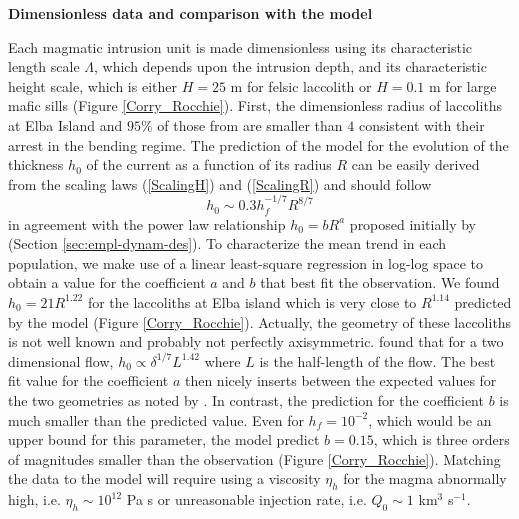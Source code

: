 \vspace{.5cm}  \textbf{Dimensionless  data  and  comparison  with  the
  model} \vspace{.5cm}

Each  magmatic   intrusion  unit  is  made   dimensionless  using  its
characteristic  length   scale  $\Lambda$,  which  depends   upon  the
intrusion depth, and its characteristic  height scale, which is either
$H=25$  m for  felsic laccolith  or $H=0.1$  m for  large mafic  sills
(Figure  \ref{Corry_Rocchie}).   First,  the dimensionless  radius  of
laccoliths at  Elba Island and  $95\%$ of those  from \citet{E:2015tl}
are  smaller than  $4$ consistent  with  their arrest  in the  bending
regime. The prediction of the model for the evolution of the thickness
$h_0$ of  the current as  a function of its  radius $R$ can  be easily
derived from  the scaling  laws (\ref{ScalingH})  and (\ref{ScalingR})
and should follow
\begin{equation}
  h_0 \sim 0.3h_f^{-1/7} R^{8/7}\label{C2-Hr}
\end{equation}
in agreement  with the  power law relationship  $h_0 =  bR^a$ proposed
initially         by         \citet{McCaffrey:1997ea}         (Section
\ref{sec:empl-dynam-des}).   To characterize  the mean  trend in  each
population, we make use of a linear least-square regression in log-log
space to obtain a value for the  coefficient $a$ and $b$ that best fit
the observation.  We  found $h_0 = 21 R^{1.22}$ for  the laccoliths at
Elba island which  is very close to $R^{1.14}$ predicted  by the model
(Figure  \ref{Corry_Rocchie}).    Actually,  the  geometry   of  these
laccoliths is not well known  and probably not perfectly axisymmetric.
\citet{Anonymous:QWXp_4JV}  found that  for  a  two dimensional  flow,
$h_0\propto \delta^{1/7}L^{1.42}$ where $L$  is the half-length of the
flow.  The best fit value for  the coefficient $a$ then nicely inserts
between  the  expected values  for  the  two  geometries as  noted  by
\citet{Michaut:2011kg}.    In  contrast,   the   prediction  for   the
coefficient $b$  is much smaller  than the predicted value.   Even for
$h_f=10^{-2}$, which would  be an upper bound for  this parameter, the
model predict  $b=0.15$, which is  three orders of  magnitudes smaller
than the observation (Figure  \ref{Corry_Rocchie}).  Matching the data
to the  model will require  using a  viscosity $\eta_h$ for  the magma
abnormally  high, i.e.   $\eta_h \sim  10^{12}$ Pa  s or  unreasonable
injection rate, i.e. $Q_0\sim 1$ km$^3$ s$^{-1}$.

